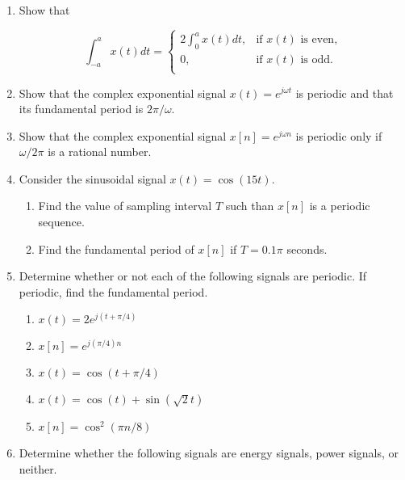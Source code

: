\documentclass[11pt]{article}
\begin{document}
\begin{enumerate}
\begin{figure}[h]
    \centering
    
\caption{}
\label{fig04}
\end{figure}

\item Show that

\begin{equation*}
    \int_{-a}^{a} x(t) dt =
    \begin{cases}
        2 \int_{0}^{a} x(t) dt, & \text{if $x(t)$ is even,} \\
        0, & \text{if $x(t)$ is odd.} \\
    \end{cases}
\end{equation*}


\item Show that the complex exponential signal $x(t)  = e^{j\omega t}$ is periodic and that its fundamental period is $2\pi / \omega$.

\item Show that the complex exponential signal $x[n]  = e^{j\omega n}$ is periodic only if $\omega / 2\pi$ is a rational number.

\item Consider the sinusoidal signal $x(t) = \cos(15t)$.
\begin{enumerate}
    \item Find the value of sampling interval $T$ such than $x[n]$ is a periodic sequence.
    \item Find the fundamental period of $x[n]$ if $T = 0.1\pi$ seconds.
\end{enumerate}


\item Determine whether or not each of the following signals are periodic. If periodic, find the fundamental period.
\begin{enumerate}
    \item $x(t) =2e^{j(t+\pi/4)}$
    \item $x[n] =e^{j(\pi/4)n}$
    \item $x(t) = \cos(t+\pi/4)$
    \item $x(t) = \cos(t) + \sin(\sqrt{2}t)$
    \item $x[n] = \cos^{2}(\pi n/8)$
\end{enumerate}


\item Determine whether the following signals are energy signals, power signals, or neither.\par



\end{enumerate}
\end{document}
